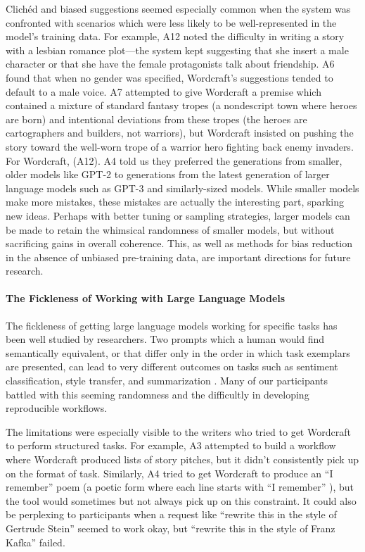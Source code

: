 Clichéd and biased suggestions seemed especially common when the system was confronted with scenarios which were less likely to be well-represented in the model's training data.
For example, A12 noted the difficulty in writing a story with a lesbian romance plot---the system kept suggesting that she insert a male character or that she have the female protagonists talk about friendship.
A6 found that when no gender was specified, Wordcraft's suggestions tended to default to a male voice.
A7 attempted to give Wordcraft a premise which contained a mixture of standard fantasy tropes (a nondescript town where heroes are born) and intentional deviations from these tropes (the heroes are cartographers and builders, not warriors), but Wordcraft insisted on pushing the story toward the well-worn trope of a warrior hero fighting back enemy invaders.
For Wordcraft,  (A12).
A4 told us they preferred the generations from smaller, older models like GPT-2 to generations from the latest generation of larger language models such as GPT-3 and similarly-sized models.
While smaller models make more mistakes, these mistakes are actually the interesting part, sparking new ideas.
Perhaps with better tuning or sampling strategies, larger models can be made to retain the whimsical randomness of smaller models, but without sacrificing gains in overall coherence.
This, as well as methods for bias reduction in the absence of unbiased pre-training data, are important directions for future research.

\paragraph{The Fickleness of Working with Large Language Models}
The fickleness of getting large language models working for specific tasks has been well studied by researchers.
Two prompts which a human would find semantically equivalent, or that differ only in the order in which task exemplars are presented, can lead to very different outcomes on tasks such as sentiment classification, style transfer, and summarization \citep{lu2022fantastically,webson2021prompt}.
Many of our participants battled with this seeming randomness and the difficultly in developing reproducible workflows.

The limitations were especially visible to the writers who tried to get Wordcraft to perform structured tasks.
For example, A3 attempted to build a workflow where Wordcraft produced lists of story pitches, but it didn't consistently pick up on the format of task.
Similarly, A4 tried to get Wordcraft to produce an ``I remember'' poem (a poetic form where each line starts with ``I remember'' \citep{nla.cat-vn4853059}), but the tool would sometimes but not always pick up on this constraint.
It could also be perplexing to participants when a request like ``rewrite this in the style of Gertrude Stein'' seemed to work okay, but ``rewrite this in the style of Franz Kafka'' failed.


